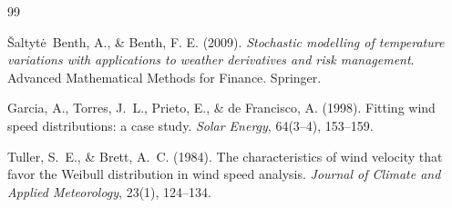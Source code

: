 \documentclass[11pt]{article}
\begin{document}
\newpage

\begin{thebibliography}{99}

Šaltytė~Benth, A., \& Benth, F. E. (2009).
\textit{Stochastic modelling of temperature variations with applications to weather derivatives and risk management}.
Advanced Mathematical Methods for Finance. Springer.

Garcia, A., Torres, J.~L., Prieto, E., \& de Francisco, A. (1998).
Fitting wind speed distributions: a case study.
\textit{Solar Energy}, 64(3--4), 153--159.

Tuller, S.~E., \& Brett, A.~C. (1984).
The characteristics of wind velocity that favor the Weibull distribution in wind speed analysis.
\textit{Journal of Climate and Applied Meteorology}, 23(1), 124--134.

\end{thebibliography}
\end{document}
